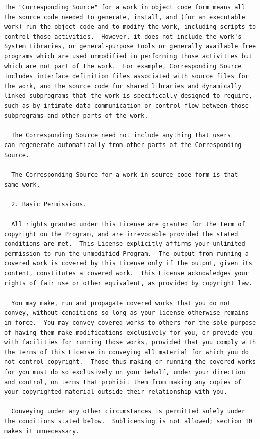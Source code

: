 \documentclass[letterpaper,10pt,english]{sphinxmanual}
\begin{document}
\begin{Verbatim}[commandchars=\\\{\}]
  The "Corresponding Source" for a work in object code form means all
the source code needed to generate, install, and (for an executable
work) run the object code and to modify the work, including scripts to
control those activities.  However, it does not include the work's
System Libraries, or general-purpose tools or generally available free
programs which are used unmodified in performing those activities but
which are not part of the work.  For example, Corresponding Source
includes interface definition files associated with source files for
the work, and the source code for shared libraries and dynamically
linked subprograms that the work is specifically designed to require,
such as by intimate data communication or control flow between those
subprograms and other parts of the work.

  The Corresponding Source need not include anything that users
can regenerate automatically from other parts of the Corresponding
Source.

  The Corresponding Source for a work in source code form is that
same work.

  2. Basic Permissions.

  All rights granted under this License are granted for the term of
copyright on the Program, and are irrevocable provided the stated
conditions are met.  This License explicitly affirms your unlimited
permission to run the unmodified Program.  The output from running a
covered work is covered by this License only if the output, given its
content, constitutes a covered work.  This License acknowledges your
rights of fair use or other equivalent, as provided by copyright law.

  You may make, run and propagate covered works that you do not
convey, without conditions so long as your license otherwise remains
in force.  You may convey covered works to others for the sole purpose
of having them make modifications exclusively for you, or provide you
with facilities for running those works, provided that you comply with
the terms of this License in conveying all material for which you do
not control copyright.  Those thus making or running the covered works
for you must do so exclusively on your behalf, under your direction
and control, on terms that prohibit them from making any copies of
your copyrighted material outside their relationship with you.

  Conveying under any other circumstances is permitted solely under
the conditions stated below.  Sublicensing is not allowed; section 10
makes it unnecessary.


\end{Verbatim}
\end{document}
